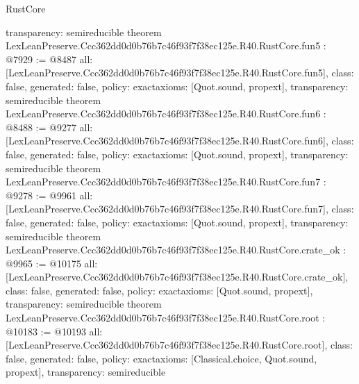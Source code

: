\begin{lexlean}{RustCore}
\begin{coremodule}
{  transparency: semireducible
}
theorem LexLeanPreserve.Ccc362dd0d0b76b7c46f93f7f38ec125e.R40.RustCore.fun5 : @7929 := @8487 {
  all: [LexLeanPreserve.Ccc362dd0d0b76b7c46f93f7f38ec125e.R40.RustCore.fun5],
  class: false,
  generated: false,
  policy: exact{axioms: [Quot.sound, propext]},
  transparency: semireducible
}
theorem LexLeanPreserve.Ccc362dd0d0b76b7c46f93f7f38ec125e.R40.RustCore.fun6 : @8488 := @9277 {
  all: [LexLeanPreserve.Ccc362dd0d0b76b7c46f93f7f38ec125e.R40.RustCore.fun6],
  class: false,
  generated: false,
  policy: exact{axioms: [Quot.sound, propext]},
  transparency: semireducible
}
theorem LexLeanPreserve.Ccc362dd0d0b76b7c46f93f7f38ec125e.R40.RustCore.fun7 : @9278 := @9961 {
  all: [LexLeanPreserve.Ccc362dd0d0b76b7c46f93f7f38ec125e.R40.RustCore.fun7],
  class: false,
  generated: false,
  policy: exact{axioms: [Quot.sound, propext]},
  transparency: semireducible
}
theorem LexLeanPreserve.Ccc362dd0d0b76b7c46f93f7f38ec125e.R40.RustCore.crate_ok : @9965 := @10175 {
  all: [LexLeanPreserve.Ccc362dd0d0b76b7c46f93f7f38ec125e.R40.RustCore.crate_ok],
  class: false,
  generated: false,
  policy: exact{axioms: [Quot.sound, propext]},
  transparency: semireducible
}
theorem LexLeanPreserve.Ccc362dd0d0b76b7c46f93f7f38ec125e.R40.RustCore.root : @10183 := @10193 {
  all: [LexLeanPreserve.Ccc362dd0d0b76b7c46f93f7f38ec125e.R40.RustCore.root],
  class: false,
  generated: false,
  policy: exact{axioms: [Classical.choice, Quot.sound, propext]},
  transparency: semireducible
}


\end{coremodule}
\end{lexlean}
